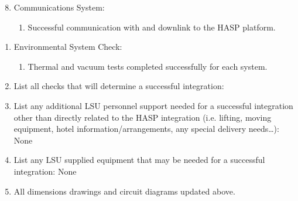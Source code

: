 \hspace*{0.5cm}
\begin{minipage}{\linewidth-0.5cm}
  \begin{enumerate}[label = \Alph*] \setcounter{enumi}{7}      
    \item Communications System:
      \begin{enumerate}
      \item Successful communication with and downlink to the HASP platform.
      \end{enumerate}
    \end{enumerate}
    \begin{enumerate}[label = -]
    \item Environmental System Check:
      \begin{enumerate}
      \item Thermal and vacuum tests completed successfully for each system.
      \end{enumerate}
    \item List all checks that will determine a successful integration:
    \item List any additional LSU personnel support needed for a successful integration other than directly related to the HASP integration (i.e. lifting, moving equipment, hotel information/arrangements, any special delivery needs…): None
    \item List any LSU supplied equipment that may be needed for a successful integration: None
    \item All dimensions drawings and circuit diagrams updated above.   
  \end{enumerate}
\end{minipage}
